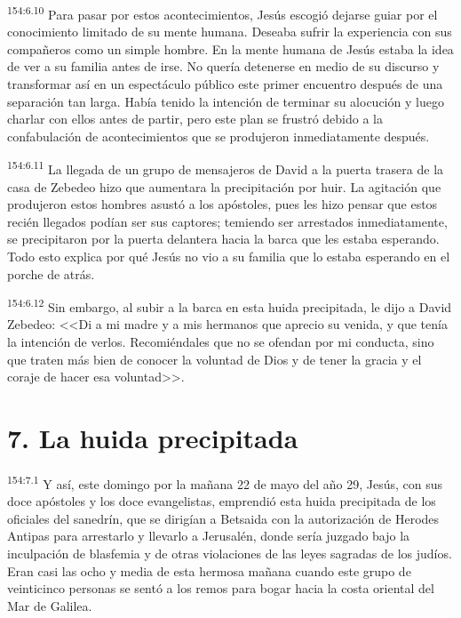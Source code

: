 \par 
\textsuperscript{154:6.10} Para pasar por estos acontecimientos, Jesús escogió dejarse guiar por el conocimiento limitado de su mente humana. Deseaba sufrir la experiencia con sus compañeros como un simple hombre. En la mente humana de Jesús estaba la idea de ver a su familia antes de irse. No quería detenerse en medio de su discurso y transformar así en un espectáculo público este primer encuentro después de una separación tan larga. Había tenido la intención de terminar su alocución y luego charlar con ellos antes de partir, pero este plan se frustró debido a la confabulación de acontecimientos que se produjeron inmediatamente después.

\par 
\textsuperscript{154:6.11} La llegada de un grupo de mensajeros de David a la puerta trasera de la casa de Zebedeo hizo que aumentara la precipitación por huir. La agitación que produjeron estos hombres asustó a los apóstoles, pues les hizo pensar que estos recién llegados podían ser sus captores; temiendo ser arrestados inmediatamente, se precipitaron por la puerta delantera hacia la barca que les estaba esperando. Todo esto explica por qué Jesús no vio a su familia que lo estaba esperando en el porche de atrás.

\par 
\textsuperscript{154:6.12} Sin embargo, al subir a la barca en esta huida precipitada, le dijo a David Zebedeo: <<Di a mi madre y a mis hermanos que aprecio su venida, y que tenía la intención de verlos. Recomiéndales que no se ofendan por mi conducta, sino que traten más bien de conocer la voluntad de Dios y de tener la gracia y el coraje de hacer esa voluntad>>.

\section*{7. La huida precipitada}
\par 
\textsuperscript{154:7.1} Y así, este domingo por la mañana 22 de mayo del año 29, Jesús, con sus doce apóstoles y los doce evangelistas, emprendió esta huida precipitada de los oficiales del sanedrín, que se dirigían a Betsaida con la autorización de Herodes Antipas para arrestarlo y llevarlo a Jerusalén, donde sería juzgado bajo la inculpación de blasfemia y de otras violaciones de las leyes sagradas de los judíos. Eran casi las ocho y media de esta hermosa mañana cuando este grupo de veinticinco personas se sentó a los remos para bogar hacia la costa oriental del Mar de Galilea.

